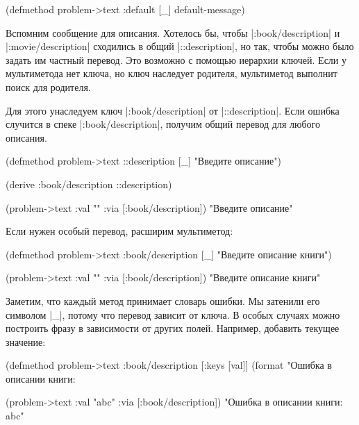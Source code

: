 \begin{english}
  \begin{clojure}
(defmethod problem->text :default [_]
  default-message)
  \end{clojure}
\end{english}


Вспомним сообщение для описания. Хотелось бы, чтобы \spverb|:book/description| и
\spverb|:movie/description| сходились в общий \spverb|::description|, но так,
чтобы можно было задать им частный перевод. Это возможно с помощью иерархии
ключей. Если у мультиметода нет ключа, но ключ наследует родителя, мультиметод
выполнит поиск для родителя.

Для этого унаследуем ключ \spverb|:book/description| от
\spverb|::description|. Если ошибка случится в спеке \spverb|:book/description|,
получим общий перевод для любого описания.


  \begin{clojure}
(defmethod problem->text ::description [_]
  "Введите описание")

(derive :book/description ::description)

(problem->text {:val "" :via [:book/description]})
"Введите описание"
  \end{clojure}

\noindent
Если нужен особый перевод, расширим мультиметод:

  \begin{clojure}
(defmethod problem->text :book/description [_]
  "Введите описание книги")

(problem->text {:val "" :via [:book/description]})
"Введите описание книги"
  \end{clojure}


Заметим, что каждый метод принимает словарь ошибки. Мы затенили его символом
\spverb|_|, потому что перевод зависит от ключа. В особых случаях можно
построить фразу в зависимости от других полей. Например, добавить текущее
значение:

  \begin{clojure}
(defmethod problem->text :book/description
  [{:keys [val]}]
  (format "Ошибка в описании книги: %

(problem->text {:val "abc" :via [:book/description]})
"Ошибка в описании книги: abc"
  \end{clojure}

